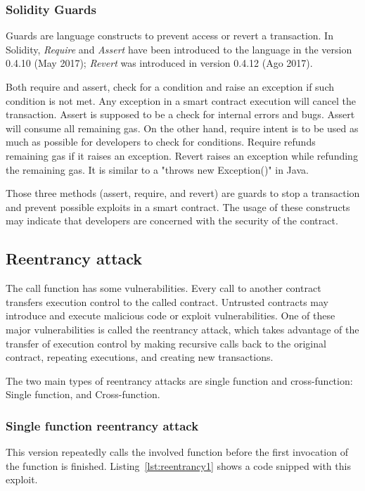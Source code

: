 \documentclass[10pt,conference]{IEEEtran}
\begin{document}
\subsubsection{Solidity Guards}

Guards are language constructs to prevent access or revert a transaction. In Solidity, \textit{Require} and \textit{Assert} have been introduced to the language in the version 0.4.10 (May 2017); \textit{Revert} was introduced in version 0.4.12 (Ago 2017).

Both {require} and {assert}, check for a condition and raise an exception if such condition is not met. Any exception in a smart contract execution will cancel the transaction. Assert is supposed to be a check for internal errors and bugs. Assert will consume all remaining gas. On the other hand, require intent is to be used as much as possible for developers to check for conditions. Require refunds remaining gas if it raises an exception.
%
Revert raises an exception while refunding the remaining gas. It is similar to a "throws new Exception()" in Java.

Those three methods (assert, require, and revert) are guards to stop a transaction and prevent possible exploits in a smart contract. The usage of these constructs may indicate that developers are concerned with the security of the contract.

\subsection{Reentrancy attack}

The call function has some vulnerabilities. Every call to another contract transfers execution control to the called contract. Untrusted contracts may introduce and execute malicious code or exploit vulnerabilities. One of these major vulnerabilities is called the reentrancy attack, which takes advantage of the transfer of execution control by making recursive calls back to the original contract, repeating executions, and creating new transactions.

The two main types of reentrancy attacks are single function and cross-function: Single function, and Cross-function.

\subsubsection{Single function reentrancy attack}
This version repeatedly calls the involved function before the first invocation of the function is finished.  Listing~\ref{lst:reentrancy1} shows a code snipped with this exploit.
\end{document}
